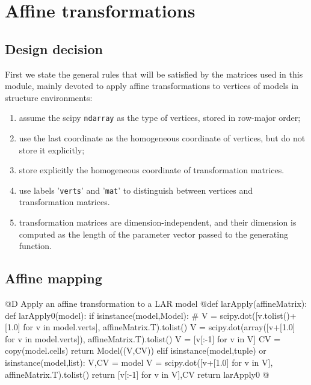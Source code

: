 \documentclass[11pt,oneside]{article}	%
\begin{document}
\section{Affine transformations}
\subsection{Design decision}
First we state the general rules that will be satisfied by the matrices used in this module, mainly devoted to apply affine transformations to vertices of models in structure environments:
\begin{enumerate}
\item assume the scipy \texttt{ndarray} as the type of vertices, stored in row-major order;
\item use the last coordinate as the homogeneous coordinate of vertices, but do not store it explicitly;
\item store explicitly the homogeneous coordinate of transformation matrices.
\item use labels '\texttt{verts}' and '\texttt{mat}' to distinguish between vertices and transformation matrices.
\item transformation matrices are dimension-independent, and their dimension is computed as the length of the parameter vector passed to the generating function.
\end{enumerate}


\subsection{Affine mapping}

@D Apply an affine transformation to a LAR model 
@{def larApply(affineMatrix):
	def larApply0(model):
		if isinstance(model,Model):
			# V = scipy.dot([v.tolist()+[1.0] for v in model.verts], affineMatrix.T).tolist()
			V = scipy.dot(array([v+[1.0] for v in model.verts]), affineMatrix.T).tolist()
			V = [v[:-1] for v in V]
			CV = copy(model.cells)
			return Model((V,CV))
		elif isinstance(model,tuple) or isinstance(model,list):
			V,CV = model
			V = scipy.dot([v+[1.0] for v in V], affineMatrix.T).tolist()
			return [v[:-1] for v in V],CV
	return larApply0
@}
\end{document}
